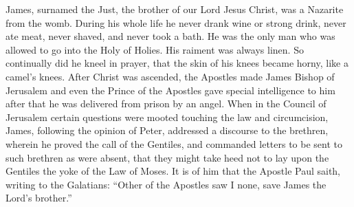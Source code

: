James, surnamed the Just, the brother of our Lord Jesus Christ, was a Nazarite from the womb. During his whole life he never drank wine or strong drink, never ate meat, never shaved, and never took a bath. He was the only man who was allowed to go into the Holy of Holies. His raiment was always linen. So continually did he kneel in prayer, that the skin of his knees became horny, like a camel’s knees. After Christ was ascended, the Apostles made James Bishop of Jerusalem and even the Prince of the Apostles gave special intelligence to him after that he was delivered from prison by an angel. When in the Council of Jerusalem certain questions were mooted touching the law and circumcision, James, following the opinion of Peter, addressed a discourse to the brethren, wherein he proved the call of the Gentiles, and commanded letters to be sent to such brethren as were absent, that they might take heed not to lay upon the Gentiles the yoke of the Law of Moses. It is of him that the Apostle Paul saith, writing to the Galatians: “Other of the Apostles saw I none, save James the Lord’s brother.”
